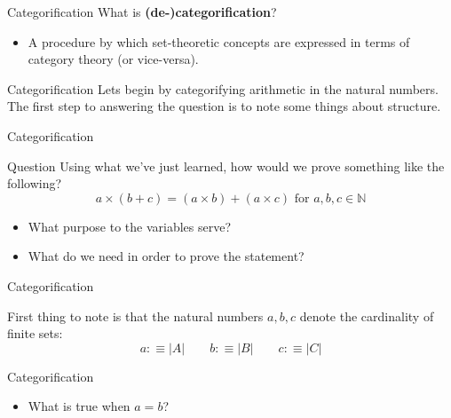 \documentclass[tikz]{beamer}
\theoremstyle{definition}
\begin{document}
\begin{frame}{Categorification}
    What is \textbf{(de-)categorification}?
    
    \begin{itemize}
        \item A procedure by which set-theoretic concepts are expressed in terms of category theory (or vice-versa).
    \end{itemize}
\end{frame}{}

\begin{frame}{Categorification}
    Lets begin by categorifying arithmetic in the natural numbers. The first step to answering the question is to note some things about structure.
\end{frame}{}

\begin{frame}{Categorification}
    \begin{block}{Question}
    Using what we've just learned, how would we prove something like the following? 
        \begin{equation*}
            a \times (b + c) = (a \times b) + (a \times c) \text{ for } a,b,c \in \mathbb{N}
        \end{equation*}
        \begin{itemize}
            \item What purpose to the variables serve? 
            \item What do we need in order to prove the statement? 
        \end{itemize}{}
    \end{block}
\end{frame}{}

\begin{frame}{Categorification}
    \begin{block}{}
        First thing to note is that the natural numbers $a, b, c$ denote the cardinality of finite sets: 
        \begin{equation*}
            a :\equiv |A| \qquad b :\equiv |B| \qquad c :\equiv |C|
        \end{equation*}
    \end{block}
\end{frame}{}

\begin{frame}{Categorification}
    \begin{block}{}
        \begin{itemize}
            \item What is true when $a = b$?
        \end{itemize}
    \end{block}{}
\end{frame}
\end{document}
